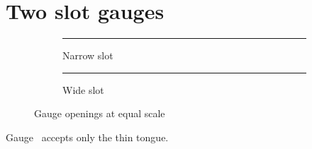 \documentclass{article}
\begin{document}
\section*{Two slot gauges}

\begin{figure}[h]\centering
\begin{subfigure}{.43\linewidth}\centering\rule{25mm}{2mm}\caption{Narrow slot}\label{a}\end{subfigure}
\begin{subfigure}{.43\linewidth}\centering\rule{25mm}{5mm}\caption{Wide slot}\label{b}\end{subfigure}
\caption{Gauge openings at equal scale}\end{figure}
Gauge~ accepts only the thin tongue.
\end{document}
